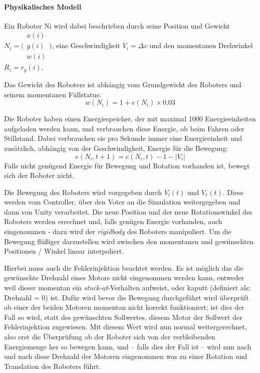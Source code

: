 \paragraph{Physikalisches Modell}
Ein Roboter \gls{Ni} wird dabei beschrieben durch seine Position und Gewicht
$ N_i = \bigl(\begin{smallmatrix} x(i) \\ y(i) \\ w(i) \end{smallmatrix}\bigr)$, eine
Geschwindigkeit $ V_i = \Delta v $ und den momentanen Drehwinkel
$ R_i = r_y(i)$. 

Das Gewicht des Roboters ist abh{\"{a}}ngig vom Grundgewicht des Roboters und seinem momentanen F{\"{u}}llstatus: 
\begin{equation}\label{eq:w}
 w(N_i) = 1 + e(N_i) \times 0.03
\end{equation}

Die Roboter haben einen Energiespeicher, der mit maximal 1000 Energieeinheiten
aufgeladen werden kann, und verbrauchen diese Energie, ob beim Fahren oder
Stillstand. Dabei verbrauchen sie pro Sekunde immer eine Energieeinheit und zus{\"{a}}tzlich, abh{\"{a}}ngig von der Geschwindigkeit, Energie f{\"{u}}r die Bewegung:
\begin{equation}\label{eq:entladen}
	e(N_i, t + 1) = e(N_i, t) - 1 - |V_i|
\end{equation}
Falls nicht gen{\"{u}}gend Energie f{\"{u}}r Bewegung und Rotation vorhanden ist, bewegt sich der Roboter nicht.

Die Bewegung des Roboters wird vorgegeben durch $V_l(t)$ und $ V_r(t)$. Diese werden vom Controller, {\"{u}}ber den Voter an die Simulation
weitergegeben und dann von Unity verarbeitet. Die neue Position und der neue Rotationswinkel des Roboters werden errechnet und,
falls gen{\"{u}}gen Energie vorhanden, auch eingenommen - dazu wird der \textit{rigidbody} des Roboters manipuliert.
Um die Bewegung fl{\"{u}}{\ss}iger darzustellen wird zwischen den momentanen und gew{\"{u}}nschten Positionen / Winkel linear interpoliert.

Hierbei muss auch die Fehlerinjektion beachtet werden. Es ist m{\"{o}}glich das die gew{\"{u}}nschte Drehzahl eines Motors nicht eingenommen werden
kann, entweder weil dieser momentan ein \textit{stuck-at}-Verhalten aufweist, oder kaputt (definiert als: Drehzahl = 0) ist. Daf{\"{u}}r wird bevor
die Bewegung durchgef{\"{u}}hrt wird {\"{u}}berpr{\"{u}}ft ob einer der beiden Motoren momentan nicht korrekt funktioniert; ist dies der Fall so wird,
statt des gew{\"{u}}nschten Sollwertes, diesem Motor der Sollwert der Fehlerinjektion zugewiesen. Mit diesem Wert wird nun normal weitergerechnet, also
erst die {\"{U}}berpr{\"{u}}fung ob der Roboter sich von der verbleibenden Energiemenge her so bewegen kann, und -- falls dies der Fall ist -- wird nun
nach und nach diese Drehzahl der Motoren eingenommen was zu einer Rotation und Translation des Roboters f{\"{u}}hrt.

